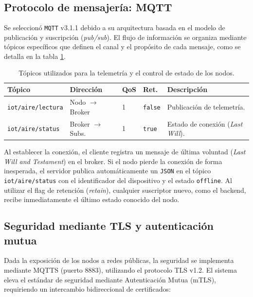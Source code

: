 \subsection{Protocolo de mensajería: MQTT}

Se seleccionó \texttt{MQTT} v3.1.1 debido a su arquitectura basada en el modelo de publicación y suscripción (\textit{pub/sub}). El flujo de información se organiza mediante tópicos específicos que definen el canal y el propósito de cada mensaje, como se detalla en la tabla \ref{tab:topicos-mqtt}.

\begin{table}[h]
    \centering
    \caption[Definición de tópicos MQTT]{Tópicos utilizados para la telemetría y el control de estado de los nodos.}
    \label{tab:topicos-mqtt}
    \begin{tabular}{p{3.5cm} p{2.5cm} p{1cm} p{1cm} p{3.5cm}}
        \toprule
        \textbf{Tópico} & \textbf{Dirección} & \textbf{QoS} & \textbf{Ret.} & \textbf{Descripción} \\
        \midrule
        \texttt{iot/aire/lectura} & Nodo $\rightarrow$ Broker & 1 & \texttt{false} & Publicación de telemetría. \\
        \texttt{iot/aire/status} & Broker $\rightarrow$ Subs. & 1 & \texttt{true} & Estado de conexión (\textit{Last Will}). \\
        \bottomrule
    \end{tabular}
\end{table}

Al establecer la conexión, el cliente registra un mensaje de última voluntad (\textit{Last Will and Testament}) en el broker. Si el nodo pierde la conexión de forma inesperada, el servidor publica automáticamente un \texttt{JSON} en el tópico \texttt{iot/aire/status} con el identificador del dispositivo y el estado \texttt{offline}. Al utilizar el flag de retención (\textit{retain}), cualquier suscriptor nuevo, como el backend, recibe inmediatamente el último estado conocido del nodo.

\subsection{Seguridad mediante TLS y autenticación mutua}

Dada la exposición de los nodos a redes públicas, la seguridad se implementa mediante MQTTS (puerto 8883), utilizando el protocolo TLS v1.2. El sistema eleva el estándar de seguridad mediante Autenticación Mutua (mTLS), requiriendo un intercambio bidireccional de certificados:


